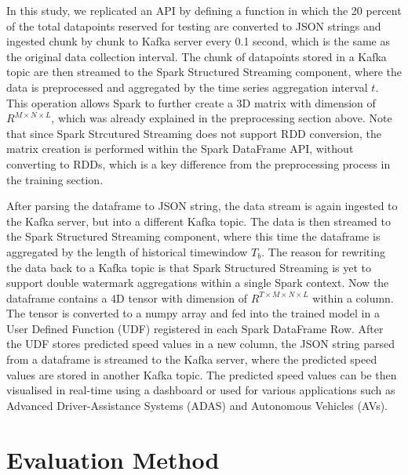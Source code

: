 \documentclass[11pt]{uonthesis}
\begin{document}
In this study, we replicated an API by defining a function in which the 20 percent of the total datapoints reserved for testing are converted to JSON strings and ingested chunk by chunk to Kafka server every 0.1 second, which is the same as the original data collection interval. The chunk of datapoints stored in a Kafka topic are then streamed to the Spark Structured Streaming component, where the data is preprocessed and aggregated by the time series aggregation interval $t$. This operation allows Spark to further create a 3D matrix with dimension of $R^{M{\times}N{\times}L}$, which was already explained in the preprocessing section above. Note that since Spark Strcutured Streaming does not support RDD conversion, the matrix creation is performed within the Spark DataFrame API, without converting to RDDs, which is a key difference from the preprocessing process in the training section. 

After parsing the dataframe to JSON string, the data stream is again ingested to the Kafka server, but into a different Kafka topic. The data is then streamed to the Spark Structured Streaming component, where this time the dataframe is aggregated by the length of historical timewindow $T_b$. The reason for rewriting the data back to a Kafka topic is that Spark Structured Streaming is yet to support double watermark aggregations within a single Spark context. Now the dataframe contains a 4D tensor with dimension of $R^{T{\times}M{\times}N{\times}L}$ within a column. The tensor is converted to a numpy array and fed into the trained model in a User Defined Function (UDF) registered in each Spark DataFrame Row. After the UDF stores predicted speed values in a new column, the JSON string parsed from a dataframe is streamed to the Kafka server, where the predicted speed values are stored in another Kafka topic. The predicted speed values can be then visualised in real-time using a dashboard or used for various applications such as Advanced Driver-Assistance Systems (ADAS) and Autonomous Vehicles (AVs). 

\section{Evaluation Method}
\end{document}
